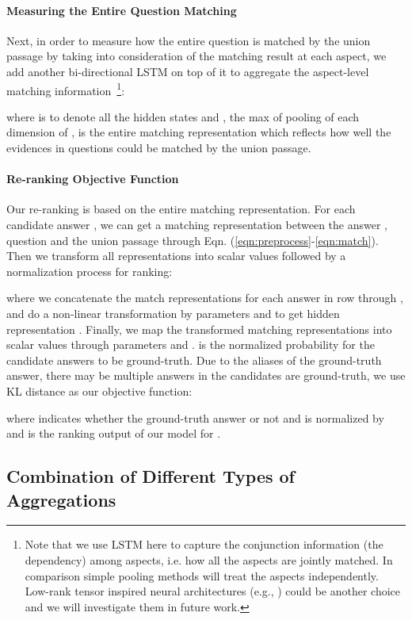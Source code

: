 \documentclass{article} \usepackage{iclr2018_conference,times}
\begin{document}
\paragraph{Measuring the Entire Question Matching}
Next, in order to measure how the entire question is matched by the union passage  by taking into consideration of the matching result at each aspect, we add another bi-directional LSTM on top of it to aggregate the aspect-level matching information~\footnote{Note that we use LSTM here to capture the conjunction information (the dependency) among aspects, i.e. how all the aspects are jointly matched. In comparison simple pooling methods will treat the aspects independently. Low-rank tensor inspired neural architectures (e.g., \citet{lei2017deriving}) could be another choice and we will investigate them in future work.}:




where  is to denote all the hidden states and , the max of pooling of each dimension of , is the entire matching representation which reflects how well the evidences in questions could be matched by the union passage.

\paragraph{Re-ranking Objective Function} Our re-ranking is based on the entire matching representation. For each candidate answer , we can get a matching representation  between the answer , question  and the union passage  through Eqn. (\ref{eqn:preprocess}-\ref{eqn:match}). Then we transform all representations into scalar values followed by a normalization process for ranking:




where we concatenate the match representations for each answer in row through , and do a non-linear transformation by parameters  and  to get hidden representation . Finally, we map the transformed matching representations  into scalar values through parameters  and .  is the normalized probability for the candidate answers to be ground-truth. Due to the aliases of the ground-truth answer, there may be multiple answers in the candidates are ground-truth, we use KL distance as our objective function:


where  indicates whether  the ground-truth answer or not and is normalized by  and  is the ranking output of our model for .

\subsection{Combination of Different Types of Aggregations}
\label{sec:method_comb}
\end{document}
